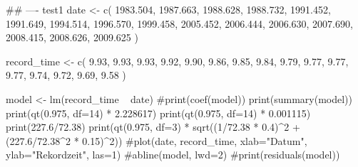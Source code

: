 ## ---- test1
date <- c(
    1983.504, 
    1987.663, 
    1988.628, 
    1988.732, 
    1991.452, 
    1991.649,
    1994.514, 
    1996.570,
    1999.458,
    2005.452,
    2006.444,
    2006.630,
    2007.690,
    2008.415,
    2008.626,
    2009.625
)

record_time <- c(
    9.93,
    9.93,
    9.93,
    9.92,
    9.90,
    9.86,
    9.85,
    9.84,
    9.79,
    9.77,
    9.77,
    9.77,
    9.74,
    9.72,
    9.69,
    9.58
)

model <- lm(record_time ~ date)
#print(coef(model))
print(summary(model))
print(qt(0.975, df=14) * 2.228617)
print(qt(0.975, df=14) * 0.001115)
print(227.6/72.38)
print(qt(0.975, df=3) * sqrt((1/72.38 * 0.4)^2 + (227.6/72.38^2 * 0.15)^2))
#plot(date, record_time, xlab="Datum", ylab="Rekordzeit", las=1)
#abline(model, lwd=2)
#print(residuals(model))
